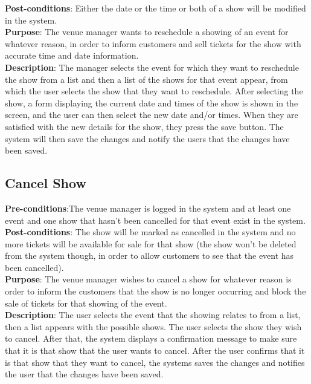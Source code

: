 \textbf{Post-conditions}: Either the date or the time or both of a show
will be modified in the system.\\

\textbf{Purpose}: The venue manager wants to reschedule a showing of
an event for whatever reason, in order to inform customers and sell
tickets for the show with accurate time and date information.\\

\textbf{Description}: The manager selects the event for which they want
to reschedule the show from a list and then a list of the shows for that
event appear, from which the user selects the show that they want to
reschedule. After selecting the show, a form displaying the current date
and times of the show is shown in the screen, and the user can then select the
new date and/or times. When they are satisfied with the new details for
the show, they press the save button. The system will then save the changes
and notify the users that the changes have been saved.

\subsection{Cancel Show}
\textbf{Pre-conditions}:The venue manager is logged in the system and at
least one event and one show that hasn't been cancelled for that event
exist in the system.\\

\textbf{Post-conditions}: The show will be marked as cancelled in the system
and no more tickets will be available for sale for that show (the show
won't be deleted from the system though, in order to allow customers
to see that the event has been cancelled).\\

\textbf{Purpose}: The venue manager wishes to cancel a show for whatever
reason is order to inform the customers that the show is no longer
occurring and block the sale of tickets for that showing of the event.\\

\textbf{Description}: The user selects the event that the showing
relates to from a list, then a list appears with the possible shows.
The user selects the show they wish to cancel. After that, the system
displays a confirmation message to make sure that it is that show that
the user wants to cancel. After the user confirms that it is that show
that they want to cancel, the systems saves the changes and notifies
the user that the changes have been saved.

